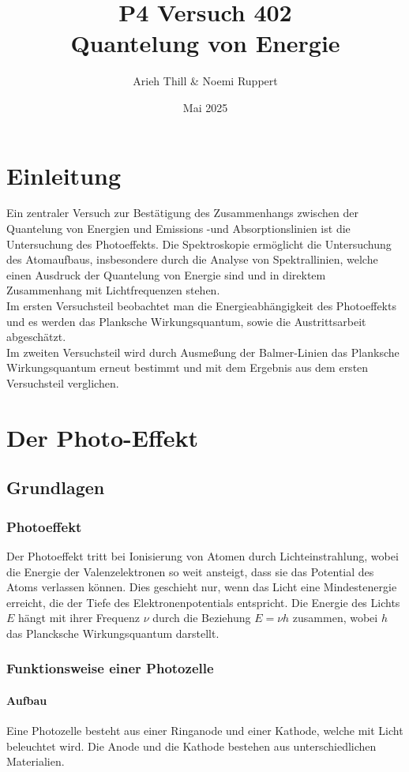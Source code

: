 \documentclass[ngerman]{scrartcl}
\title{P4 Versuch 402 \\[1ex] \large Quantelung von Energie}
\author{Arieh Thill \& Noemi Ruppert}
\date{Mai 2025}
\begin{document}
\maketitle
\clearpage
\tableofcontents
\clearpage
\section{Einleitung}
Ein zentraler Versuch zur Bestätigung des Zusammenhangs zwischen der Quantelung von Energien und Emissions -und Absorptionslinien ist die Untersuchung des Photoeffekts. Die Spektroskopie ermöglicht die Untersuchung des Atomaufbaus, insbesondere durch die Analyse von Spektrallinien, welche einen Ausdruck der Quantelung von Energie sind und in direktem Zusammenhang mit Lichtfrequenzen stehen. \\
Im ersten Versuchsteil beobachtet man die Energieabhängigkeit des Photoeffekts und es werden das Planksche Wirkungsquantum, sowie die Austrittsarbeit abgeschätzt. 
\\
Im zweiten Versuchsteil wird durch Ausmeßung der Balmer-Linien das Planksche Wirkungsquantum erneut bestimmt und mit dem Ergebnis aus dem ersten Versuchsteil verglichen.
\clearpage
\section{Der Photo-Effekt}
\subsection{Grundlagen}
\subsubsection{Photoeffekt}
Der Photoeffekt tritt bei Ionisierung von Atomen durch Lichteinstrahlung, wobei die Energie der Valenzelektronen so weit ansteigt, dass sie das Potential des Atoms verlassen können. Dies geschieht nur, wenn das Licht eine Mindestenergie erreicht, die der Tiefe des Elektronenpotentials entspricht. Die Energie des Lichts \(E\) hängt mit ihrer Frequenz \(\nu\) durch die Beziehung \(E = \nu h\) zusammen, wobei \(h\) das Plancksche Wirkungsquantum darstellt. 
\subsubsection{Funktionsweise einer Photozelle}
\paragraph{Aufbau}
Eine Photozelle besteht aus einer Ringanode und einer Kathode, welche mit Licht beleuchtet
wird. Die Anode und die Kathode bestehen aus unterschiedlichen Materialien.
\end{document}
